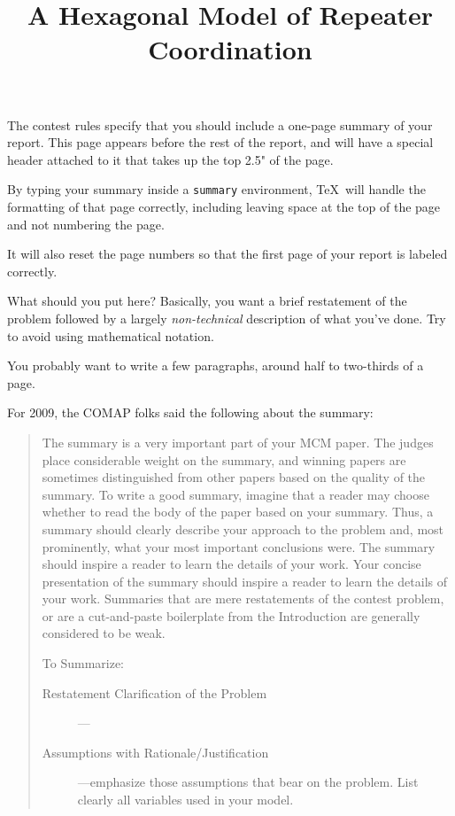 \documentclass{icmmcm}
\title{A Hexagonal Model of Repeater Coordination}
\begin{document}

\begin{summary}
  The contest rules specify that you should include a one-page summary
  of your report.  This page appears before the rest of the report,
  and will have a special header attached to it that takes up the top
  2.5" of the page.

  By typing your summary inside a \texttt{summary} environment, \TeX\ will
  handle the formatting of that page correctly, including leaving
  space at the top of the page and not numbering the page.
  
  It will also reset the page numbers so that the first page of your
  report is labeled correctly.
  
  What should you put here?  Basically, you want a brief restatement
  of the problem followed by a largely \emph{non-technical}
  description of what you've done.  Try to avoid using mathematical
  notation.
  
  You probably want to write a few paragraphs, around half to
  two-thirds of a page.

  For 2009, the COMAP folks said the following about the summary:
  \begin{quotation}
    The summary is a very important part of your MCM paper. The
    judges place considerable weight on the summary, and winning
    papers are sometimes distinguished from other papers based on
    the quality of the summary. To write a good summary, imagine
    that a reader may choose whether to read the body of the paper
    based on your summary. Thus, a summary should clearly describe
    your approach to the problem and, most prominently, what your
    most important conclusions were. The summary should inspire a
    reader to learn the details of your work.  Your concise
    presentation of the summary should inspire a reader to learn
    the details of your work. Summaries that are mere restatements
    of the contest problem, or are a cut-and-paste boilerplate
    from the Introduction are generally considered to be
    weak.

To Summarize:
\begin{description}
\item[Restatement Clarification of the Problem]
---

\item[Assumptions with Rationale/Justification]---emphasize those
  assumptions that bear on the problem. List clearly all variables
  used in your model.


\end{description}
\end{quotation}
\end{summary}
\end{document}
